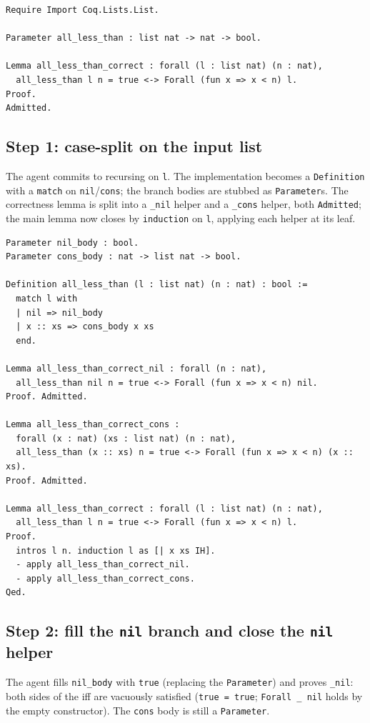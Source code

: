 \begin{lstlisting}[label={lst:state0}, caption={Step 0: spec only.}]
Require Import Coq.Lists.List.

Parameter all_less_than : list nat -> nat -> bool.

Lemma all_less_than_correct : forall (l : list nat) (n : nat),
  all_less_than l n = true <-> Forall (fun x => x < n) l.
Proof.
Admitted.
\end{lstlisting}

\subsection{Step 1: case-split on the input list}
The agent commits to recursing on \texttt{l}. The implementation becomes a \texttt{Definition} with a \texttt{match} on \texttt{nil}/\texttt{cons}; the branch bodies are stubbed as \texttt{Parameter}s. The correctness lemma is split into a \texttt{\_nil} helper and a \texttt{\_cons} helper, both \texttt{Admitted}; the main lemma now closes by \texttt{induction} on \texttt{l}, applying each helper at its leaf.

\begin{lstlisting}
Parameter nil_body : bool.
Parameter cons_body : nat -> list nat -> bool.

Definition all_less_than (l : list nat) (n : nat) : bool :=
  match l with
  | nil => nil_body
  | x :: xs => cons_body x xs
  end.

Lemma all_less_than_correct_nil : forall (n : nat),
  all_less_than nil n = true <-> Forall (fun x => x < n) nil.
Proof. Admitted.

Lemma all_less_than_correct_cons :
  forall (x : nat) (xs : list nat) (n : nat),
  all_less_than (x :: xs) n = true <-> Forall (fun x => x < n) (x :: xs).
Proof. Admitted.

Lemma all_less_than_correct : forall (l : list nat) (n : nat),
  all_less_than l n = true <-> Forall (fun x => x < n) l.
Proof.
  intros l n. induction l as [| x xs IH].
  - apply all_less_than_correct_nil.
  - apply all_less_than_correct_cons.
Qed.
\end{lstlisting}

\subsection{Step 2: fill the \texttt{nil} branch and close the \texttt{nil} helper}
The agent fills \texttt{nil\_body} with \texttt{true} (replacing the \texttt{Parameter}) and proves \texttt{\_nil}: both sides of the iff are vacuously satisfied (\texttt{true = true}; \texttt{Forall \_ nil} holds by the empty constructor). The \texttt{cons} body is still a \texttt{Parameter}.

